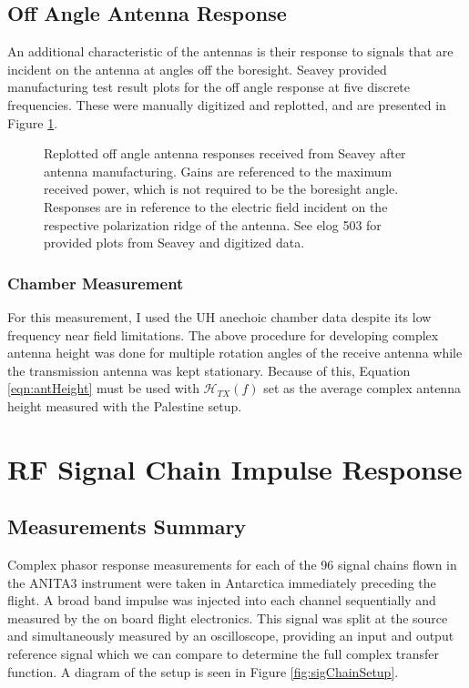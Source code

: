	\subsection{Off Angle Antenna Response}
		An additional characteristic of the antennas is their response to signals that are incident on the antenna at angles off the boresight.  Seavey provided manufacturing test result plots for the off angle response at five discrete frequencies.  These were manually digitized and replotted, and are presented in Figure \ref{fig:seaveyOffAngle}.
		
		
\begin{figure}
\centering
{}
	\caption{Replotted off angle antenna responses received from Seavey after antenna manufacturing.  Gains are referenced to the maximum received power, which is not required to be the boresight angle.  Responses are in reference to the electric field incident on the respective polarization ridge of the antenna.  See elog 503 for provided plots from Seavey and digitized data.}
\label{fig:seaveyOffAngle}
\end{figure}

	\subsubsection{Chamber Measurement} %
For this measurement, I used the UH anechoic chamber data despite its low frequency near field limitations.  The above procedure for developing complex antenna height was done for multiple rotation angles of the receive antenna while the transmission antenna was kept stationary.  Because of this, Equation \ref{eqn:antHeight} must be used with $\mathcal{H}_{TX}(f)$ set as the average complex antenna height measured with the Palestine setup.
		



\section{RF Signal Chain Impulse Response}
		
	\subsection{Measurements Summary}
		Complex phasor response measurements for each of the 96 signal chains flown in the ANITA3 instrument were taken in Antarctica immediately preceding the flight. A broad band impulse was injected into each channel sequentially and measured by the on board flight electronics.  This signal was split at the source and simultaneously measured by an oscilloscope, providing an input and output reference signal which we can compare to determine the full complex transfer function.  A diagram of the setup is seen in Figure \ref{fig:sigChainSetup}.


